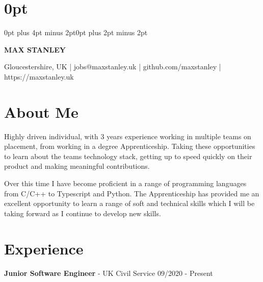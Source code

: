 \documentclass{article}
\begin{document}
\setlength\parindent{0pt}
\setlength{\parskip}{.8em} 
\titlespacing\section{0pt}{0pt plus 4pt minus 2pt}{0pt plus 2pt minus 2pt}

\begin{center}
\begin{huge}
\textbf{MAX STANLEY}
\end{huge}

Gloucestershire, UK
|
jobs@maxstanley.uk
|
github.com/maxstanley
|
https://maxstanley.uk

\end{center}

\section*{About Me}

Highly driven individual, with 3 years experience working in multiple teams on placement, from working in a degree Apprenticeship.
Taking these opportunities to learn about the teams technology stack, getting up to speed quickly on their product and making meaningful contributions.

Over this time I have become proficient in a range of programming languages from C/C++ to Typescript and Python.
The Apprenticeship has provided me an excellent opportunity to learn a range of soft and technical skills which I will be taking forward as I continue to develop new skills.

\section*{Experience}

\textbf{Junior Software Engineer} - UK Civil Service \hfill 09/2020 - Present
\end{document}
